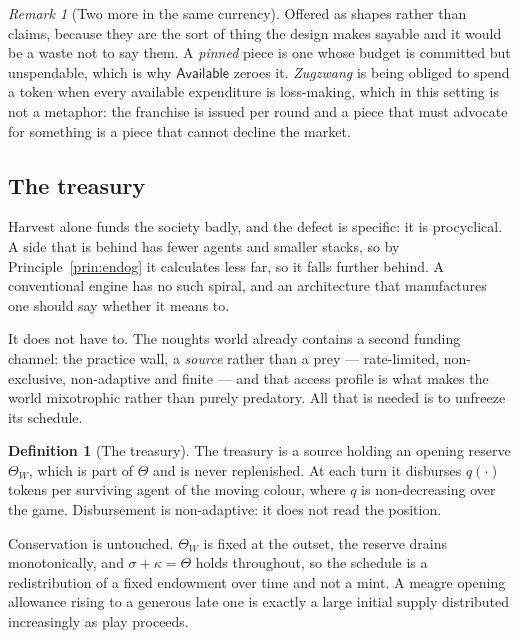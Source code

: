 \documentclass[11pt,a4paper]{article}
\theoremstyle{plain}
\theoremstyle{definition}
\newtheorem{definition}[theorem]{Definition}
\theoremstyle{remark}
\newtheorem{remark}[theorem]{Remark}
\begin{document}
\begin{remark}[Two more in the same currency]
\label{rem:currency}
Offered as shapes rather than claims, because they are the sort of thing the
design makes sayable and it would be a waste not to say them. A \emph{pinned}
piece is one whose budget is committed but unspendable, which is why
$\mathsf{Available}$ zeroes it. \emph{Zugzwang} is being obliged to spend a token
when every available expenditure is loss-making, which in this setting is not a
metaphor: the franchise is issued per round and a piece that must advocate for
something is a piece that cannot decline the market.
\end{remark}


\subsection{The treasury}
\label{sec:treasury}

Harvest alone funds the society badly, and the defect is specific: it is
procyclical. A side that is behind has fewer agents and smaller stacks, so by
Principle~\ref{prin:endog} it calculates less far, so it falls further behind.
A conventional engine has no such spiral, and an architecture that manufactures
one should say whether it means to.

It does not have to. The noughts world already contains a second funding
channel: the practice wall, a \emph{source} rather than a prey --- rate-limited,
non-exclusive, non-adaptive and finite --- and that access profile is what makes
the world mixotrophic rather than purely predatory. All that is needed is to
unfreeze its schedule.

\begin{definition}[The treasury]
\label{def:treasury}
The treasury is a source holding an opening reserve $\Theta_W$, which is part of
$\Theta$ and is never replenished. At each turn it disburses $q(\cdot)$ tokens
per surviving agent of the moving colour, where $q$ is non-decreasing over the
game. Disbursement is non-adaptive: it does not read the position.
\end{definition}

Conservation is untouched. $\Theta_W$ is fixed at the outset, the reserve
drains monotonically, and $\sigma + \kappa = \Theta$ holds throughout, so the
schedule is a redistribution of a fixed endowment over time and not a mint. A
meagre opening allowance rising to a generous late one is exactly a large
initial supply distributed increasingly as play proceeds.
\end{document}
